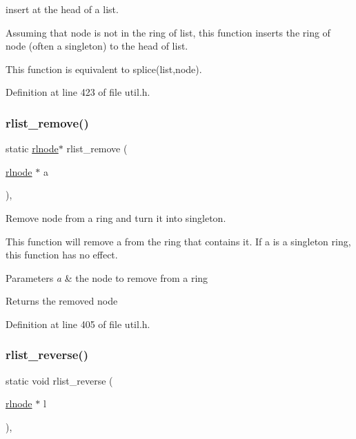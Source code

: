 insert at the head of a list. 

Assuming that {\ttfamily node} is not in the ring of {\ttfamily list}, this function inserts the ring of {\ttfamily node} (often a singleton) to the head of {\ttfamily list}.

This function is equivalent to {\ttfamily splice(list,node)}. 

Definition at line 423 of file util.\+h.

\mbox{\label{group__rlists_ga9177b286dcefd1d853aae220a98d3c7b}} 
\subsubsection{\texorpdfstring{rlist\+\_\+remove()}{rlist\_remove()}}
{\footnotesize\ttfamily static \hyperlink{group__rlists_ga8f6244877f7ce2322c90525217ea6e7a}{rlnode}$\ast$ rlist\+\_\+remove (\begin{DoxyParamCaption}\item[{\hyperlink{group__rlists_ga8f6244877f7ce2322c90525217ea6e7a}{rlnode} $\ast$}]{a }\end{DoxyParamCaption})\hspace{0.3cm}{\ttfamily [inline]}, {\ttfamily [static]}}



Remove node from a ring and turn it into singleton. 

This function will remove {\ttfamily a} from the ring that contains it. If {\ttfamily a} is a singleton ring, this function has no effect. 
\begin{DoxyParams}{Parameters}
{\em a} & the node to remove from a ring \\
\hline
\end{DoxyParams}
\begin{DoxyReturn}{Returns}
the removed node 
\end{DoxyReturn}


Definition at line 405 of file util.\+h.

\mbox{\label{group__rlists_ga3911836f21f2f50b4caa2fa1d8e1f1de}} 
\subsubsection{\texorpdfstring{rlist\+\_\+reverse()}{rlist\_reverse()}}
{\footnotesize\ttfamily static void rlist\+\_\+reverse (\begin{DoxyParamCaption}\item[{\hyperlink{group__rlists_ga8f6244877f7ce2322c90525217ea6e7a}{rlnode} $\ast$}]{l }\end{DoxyParamCaption})\hspace{0.3cm}{\ttfamily [inline]}, {\ttfamily [static]}}



